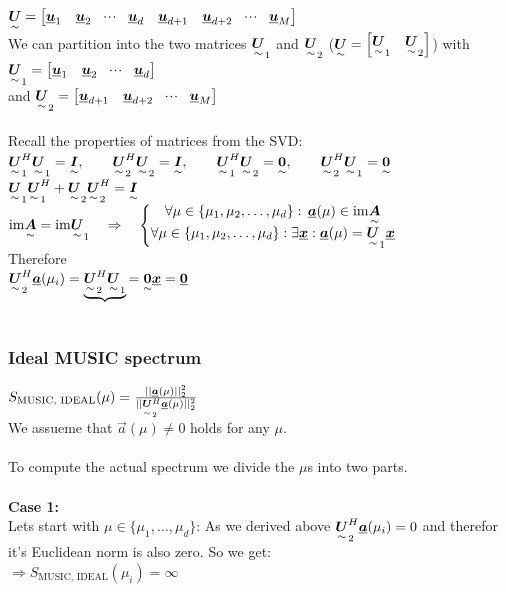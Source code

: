 $\ma{U}=\mat{\vec{u}_1 & \vec{u}_2 & \shdots & \vec{u}_d & \vec{u}_{d+1} & \vec{u}_{d+2} &\shdots & \vec{u}_M}$\\
We can partition  into the two matrices $\ma{U}_1$ and $\ma{U}_2$ ($\ma{U}=\mat{\ma{U}_1 & \ma{U}_2}$) with\\
$\ma{U}_1 = \mat{\vec{u}_1 & \vec{u}_2 & \shdots & \vec{u}_d}$\\
and
$\ma{U}_2 = \mat{\vec{u}_{d+1} & \vec{u}_{d+2} &\shdots & \vec{u}_M}$\\ \\

Recall the properties of matrices from the SVD:\\
$\ma{U}^H_1\ma{U}_1=\ma{I}, \qquad \ma{U}^H_2\ma{U}_2=\ma{I}, \qquad \ma{U}^H_1\ma{U}_2=\ma{0}, \qquad \ma{U}^H_2\ma{U}_1=\ma{0}$\\
$\ma{U}_1\ma{U}^H_1 + \ma{U}_2\ma{U}^H_2 = \ma{I}$\\
$\text{im}\ma{A}= \text{im}\ma{U}_1 \pfeil
\left\lbrace \begin{matrix}
 \forall \mu\in\{\mu_1,\mu_2,\ldots,\mu_d\}:\, \vec{a}(\mu)\in\text{im}\ma{A}\\
 \forall \mu\in\{\mu_1,\mu_2,\ldots,\mu_d\}:\exists\vec{x}:\vec{a}(\mu)=\ma{U}_1\vec{x}
\end{matrix} \right.$\\
Therefore\\
$\ma{U}_2^H\vec{a}(\mu_i)=\underbrace{\ma{U}_2^H\ma{U}_1}{=\ma{0}}\vec{x}=\vec{0}$\\ \ \\

\subsubsection{Ideal MUSIC spectrum}

$S_{\text{MUSIC, IDEAL}}(\mu)=\frac{||\vec{a}(\mu)||_2^2}{||\ma{U}_2^H\vec{a}(\mu)||_2^2}$\\
We assueme that $\vec{a}(\mu)\neq0$ holds for any $\mu$.\\ \\

To compute the actual spectrum we divide the $\mu$s into two parts.\\ \\

\textbf{Case 1:}\\
Lets start with $\mu\in\{\mu_1,\ldots,\mu_d\}$:
As we derived above $\ma{U}_2^H\vec{a}(\mu_i)=0$ and therefor it's Euclidean norm is also zero. So we get:\\
$\Rightarrow S_{\text{MUSIC, IDEAL}}(\mu_i)=\infty$\\

